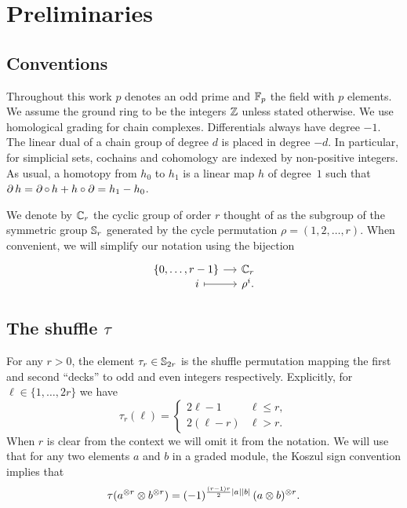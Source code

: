 
\section{Preliminaries}\label{s:preliminaries}

\subsection{Conventions}

Throughout this work $p$ denotes an odd prime and ${\mathbb{F}_p}$ the field with $p$ elements.
We assume the ground ring to be the integers $\mathbb{Z}$ unless stated otherwise.
We use homological grading for chain complexes.
Differentials always have degree $-1$.
The linear dual of a chain group of degree $d$ is placed in degree $-d$.
In particular, for simplicial sets, cochains and cohomology are	indexed by non-positive integers.
As usual, a homotopy from $h_0$ to $h_1$ is a linear map $h$ of degree~$1$ such that $\operatorname{\partial} h = \operatorname{\partial} \mathbin{\circ} \,h + h \mathbin{\circ} \operatorname{\partial} = h_1 - h_0$.

We denote by $\mathbb{C}_r$ the cyclic group of order $r$ thought of as the subgroup of the symmetric group $\mathbb{S}_r$ generated by the cycle permutation $\rho = (1,2,\dots,r)$.
When convenient, we will simplify our notation using the bijection
\[
\begin{tikzcd}[column sep=small,row sep=-5]
	\{0,\dots,r-1\} \rar & \cyc_r \\
	\qquad i \rar[maps to] & \rho^i.
\end{tikzcd}
\]

\subsection{The shuffle $\tau$}\label{ss:shuffle}

For any $r > 0$, the element $\tau_r \in \mathbb{S}_{2r}$ is the shuffle permutation mapping the first and second ``decks'' to odd and even integers respectively.
Explicitly, for $\ell \in \{1,\dots,2r\}$ we have
\[
	\tau_r(\ell) =
	\begin{cases}
		2\ell-1 & \ell \leq r, \\
		2(\ell-r) & \ell > r.
	\end{cases}
\]
When $r$ is clear from the context we will omit it from the notation.
We will use that for any two elements $a$ and $b$ in a graded module, the Koszul sign convention implies that
\[
\tau(a^{\otimes r} \otimes b^{\otimes r}) =
(-1)^{\frac{(r-1)r}{2}\lvert a\rvert\lvert b\rvert} \, (a \otimes b)^{\otimes r}.
\]

